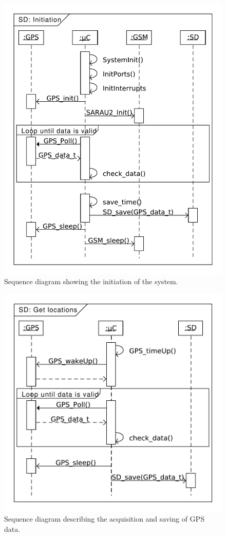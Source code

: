 \begin{figure}
	\centering
	\includegraphics[width=0.7\linewidth]{gfx/Design/SD_init.pdf}
	\caption{Sequence diagram showing the initiation of the system.}
	\label{fig:SD:init}
\end{figure}

\begin{figure}
	\centering
	\includegraphics[width=0.7\linewidth]{gfx/Design/SD_getLocation.pdf}
	\caption{Sequence diagram describing the acquisition and saving of GPS data.}
	\label{fig:SD:getlocation}
\end{figure}


